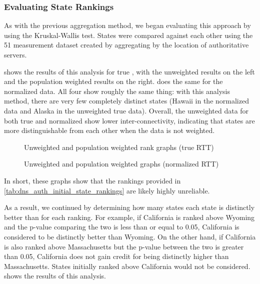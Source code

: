 \subsubsection{Evaluating State Rankings}

As with the previous aggregation method, we began evaluating this approach by using the Kruskal-Wallis test. States were compared against each other using the 51 measurement dataset created by aggregating by the location of authoritative servers.

 shows the results of this analysis for true \rtt, with the unweighted results on the left and the population weighted results on the right.  does the same for the normalized data. All four show roughly the same thing: with this analysis method, there are very few completely distinct states (Hawaii in the normalized data and Alaska in the unweighted true \rtt data). Overall, the unweighted data for both true \rtt and normalized \rtt show lower inter-connectivity, indicating that states are more distinguishable from each other when the data is not weighted.

\begin{figure}[htb]
    \centering
    
    
    \caption{Unweighted and population weighted rank graphs (true RTT)}
    \label{fig:dns_auth_agg_s2s_true_rtt_graphs}
\end{figure}

\begin{figure}[h]
    \centering
    
    
    \caption{Unweighted and population weighted graphs (normalized RTT)}
    \label{fig:dns_auth_agg_s2s_norm_rtt_graphs}
\end{figure}

In short, these graphs show that the rankings provided in \cref{tab:dns_auth_initial_state_rankings} are likely highly unreliable.

As a result, we continued by determining how many states each state is distinctly better than for each ranking. For example, if California is ranked above Wyoming and the p-value comparing the two is less than or equal to 0.05, California is considered to be distinctly better than Wyoming. On the other hand, if California is also ranked above Massachusetts but the p-value between the two is greater than 0.05, California does not gain credit for being distinctly higher than Massachusetts. States initially ranked above California would not be considered.  shows the results of this analysis.

